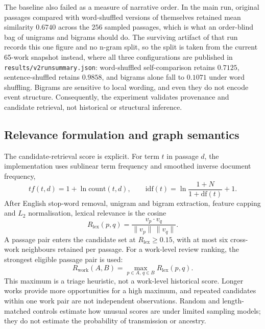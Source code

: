 \documentclass[11pt]{article}
\DeclareRobustCommand{\_}{\textunderscore\allowbreak}
\begin{document}
The baseline also failed as a measure of narrative order. In the main run, original
passages compared with word-shuffled versions of themselves retained mean similarity
\(0.6740\) across the \(256\) sampled passages, which is what an order-blind bag of
unigrams and bigrams should do. The surviving artifact of that run records this one
figure and no n-gram split, so the split is taken from the current 65-work snapshot
instead, where all three configurations are published in
\texttt{results/v2\_run\_summary.json}: word-shuffled self-comparison retains
\(0.7125\), sentence-shuffled retains \(0.9858\), and bigrams alone fall to \(0.1071\)
under word shuffling. Bigrams are sensitive to local wording, and even they do not
encode event structure. Consequently, the experiment validates provenance and
candidate retrieval, not historical or structural inference.

\subsection{Relevance formulation and graph semantics}

The candidate-retrieval score is explicit. For term \(t\) in passage \(d\), the
implementation uses sublinear term frequency and smoothed inverse document
frequency,
\begin{equation}
  tf(t,d) = 1 + \ln \mathrm{count}(t,d), \qquad
  \mathrm{idf}(t) = \ln \frac{1+N}{1+\mathrm{df}(t)} + 1 .
\end{equation}
After English stop-word removal, unigram and bigram extraction, feature capping
and \(L_2\) normalisation, lexical relevance is the cosine
\begin{equation}
  R_{\mathrm{lex}}(p,q) = \frac{v_p \cdot v_q}{\lVert v_p\rVert\,\lVert v_q\rVert}.
\end{equation}
A passage pair enters the candidate set at \(R_{\mathrm{lex}} \ge 0.15\), with at
most six cross-work neighbours retained per passage. For a work-level review
ranking, the strongest eligible passage pair is used:
\begin{equation}
  R_{\mathrm{work}}(A,B) = \max_{p \in A,\, q \in B} R_{\mathrm{lex}}(p,q).
\end{equation}
This maximum is a triage heuristic, not a work-level historical score. Longer
works provide more opportunities for a high maximum, and repeated candidates
within one work pair are not independent observations. Random and length-matched
controls estimate how unusual scores are under limited sampling models; they do
not estimate the probability of transmission or ancestry.
\end{document}
